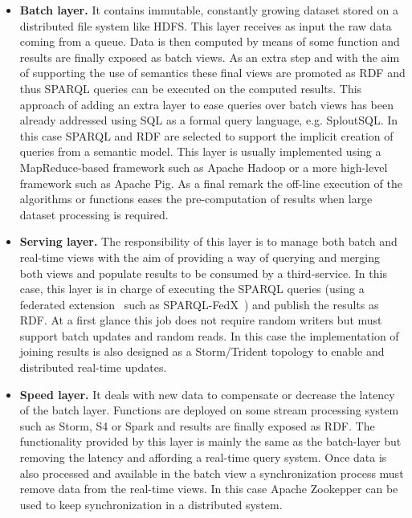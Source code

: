 \begin{itemize}
 \item \textbf{Batch layer.} It contains immutable, constantly growing dataset stored on a distributed file system like HDFS. This layer 
 receives as input the raw data coming from a queue. Data is then computed by means of some function and results are finally exposed 
 as batch views. As an extra step and with the aim of supporting the use of semantics these final views are promoted as RDF and thus SPARQL queries 
 can be executed on the computed results. This approach of adding an extra layer to ease queries over batch views has been 
 already addressed using SQL as a formal query language, e.g. SploutSQL. In this case SPARQL and RDF are selected to support the implicit 
 creation of queries from a semantic model. This layer is usually implemented using a MapReduce-based framework such as Apache Hadoop or 
 a more high-level framework such as Apache Pig. As a final remark the off-line execution of the algorithms or functions 
 eases the pre-computation of results when large dataset processing is required.
 
 \item \textbf{Serving layer.} The responsibility of this layer is to manage both batch and real-time views 
 with the aim of providing a way of querying and merging both views and populate results to be consumed by 
 a third-service. In this case, this layer is in charge of executing the SPARQL queries (using a federated extension~\cite{DBLP:journals/corr/RakhmawatiUKHH13} 
 such as SPARQL-FedX~\cite{DBLP:conf/esws/SchwarteHHSS11}) and publish the results as RDF. At a first glance this job does not require 
 random writers but must support batch updates and random reads. In this case the implementation of joining 
 results is also designed as a Storm/Trident topology to enable and distributed real-time updates.

\item \textbf{Speed layer.} It deals with new data to compensate or decrease the latency of the batch layer. 
Functions are deployed on some stream processing system such as Storm, S4 or Spark and results are finally 
exposed as RDF. The functionality provided by this layer is mainly the same as the batch-layer but removing 
the latency and affording a real-time query system. Once data is also processed and available in the batch 
view a synchronization process must remove data from the real-time views. In this case Apache Zookepper 
can be used to keep synchronization in a distributed system.
\end{itemize}

